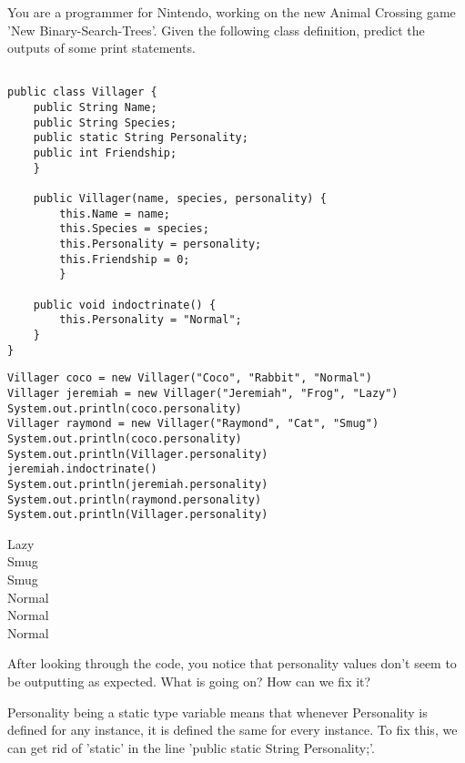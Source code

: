 You are a programmer for Nintendo, working on the new Animal Crossing game 'New Binary-Search-Trees'. Given the following class definition, predict the outputs of some print statements. 
\begin{lstlisting}

public class Villager {
    public String Name;
    public String Species;
    public static String Personality;
    public int Friendship;
    }

    public Villager(name, species, personality) {
        this.Name = name;
        this.Species = species;
        this.Personality = personality;
        this.Friendship = 0;
        }

    public void indoctrinate() {
        this.Personality = "Normal";
    }
}
\end{lstlisting}
\question
\begin{lstlisting}
Villager coco = new Villager("Coco", "Rabbit", "Normal")
Villager jeremiah = new Villager("Jeremiah", "Frog", "Lazy")
System.out.println(coco.personality)
Villager raymond = new Villager("Raymond", "Cat", "Smug")
System.out.println(coco.personality)
System.out.println(Villager.personality)
jeremiah.indoctrinate()
System.out.println(jeremiah.personality)
System.out.println(raymond.personality)
System.out.println(Villager.personality)
\end{lstlisting}

\begin{solution}
Lazy\\
Smug\\
Smug\\
Normal\\
Normal\\
Normal
\end{solution}

After looking through the code, you notice that personality values don't seem to be outputting as expected. What is going on? How can we fix it?

\begin{solution}
Personality being a static type variable means that whenever Personality is defined for any instance, it is defined the same for every instance. To fix this, we can get rid of 'static' in the line 'public static String Personality;'. 
\end{solution}